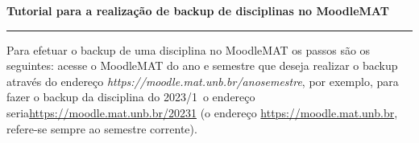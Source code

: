 \documentclass[12pt]{report}
\def\ano{2023}
\def\semestre{1}
\begin{document}
\begin{center}
{\Large \textbf{Tutorial para a realiza\c{c}\~ao de backup de disciplinas no MoodleMAT}}
\end{center}
\vspace{.3cm}
\hrule

\vspace{.7cm}

Para efetuar o backup de uma disciplina no MoodleMAT os passos s\~ao os seguintes: acesse o MoodleMAT do ano e semestre que deseja realizar
o backup atrav\'es do endere\c{c}o \textit{https://moodle.mat.unb.br/anosemestre}, por exemplo, para fazer o backup da disciplina do
\ano/\semestre\ o endere\c{c}o seria\linebreak \href{https://moodle.mat.unb.br/\ano\semestre}{https://moodle.mat.unb.br/\ano\semestre} (o endere\c{c}o \href{https://moodle.mat.unb.br}{https://moodle.mat.unb.br}, refere-se sempre ao semestre corrente).
\end{document}
